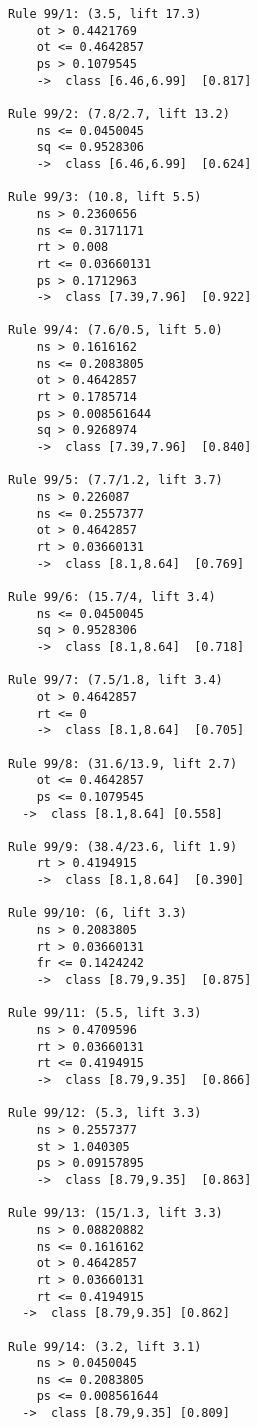 \begin{tcolorbox}[title=Reglas de clasificación para identificar intervalos de notas.]
  \makeatletter
  \makeatother
  
 \label{rulesbegin2}  
  
\begin{multicols}{3}
    \begin{verbatim}
Rule 99/1: (3.5, lift 17.3)
	ot > 0.4421769
	ot <= 0.4642857
	ps > 0.1079545
	->  class [6.46,6.99]  [0.817]

Rule 99/2: (7.8/2.7, lift 13.2)
	ns <= 0.0450045
	sq <= 0.9528306
	->  class [6.46,6.99]  [0.624]

Rule 99/3: (10.8, lift 5.5)
	ns > 0.2360656
	ns <= 0.3171171
	rt > 0.008
	rt <= 0.03660131
	ps > 0.1712963
	->  class [7.39,7.96]  [0.922]

Rule 99/4: (7.6/0.5, lift 5.0)
	ns > 0.1616162
	ns <= 0.2083805
	ot > 0.4642857
	rt > 0.1785714
	ps > 0.008561644
	sq > 0.9268974
	->  class [7.39,7.96]  [0.840]

Rule 99/5: (7.7/1.2, lift 3.7)
	ns > 0.226087
	ns <= 0.2557377
	ot > 0.4642857
	rt > 0.03660131
	->  class [8.1,8.64]  [0.769]

Rule 99/6: (15.7/4, lift 3.4)
	ns <= 0.0450045
	sq > 0.9528306
	->  class [8.1,8.64]  [0.718]

Rule 99/7: (7.5/1.8, lift 3.4)
	ot > 0.4642857
	rt <= 0
	->  class [8.1,8.64]  [0.705]

Rule 99/8: (31.6/13.9, lift 2.7)
	ot <= 0.4642857
	ps <= 0.1079545
  ->  class [8.1,8.64] [0.558]

Rule 99/9: (38.4/23.6, lift 1.9)
	rt > 0.4194915
	->  class [8.1,8.64]  [0.390]

Rule 99/10: (6, lift 3.3)
	ns > 0.2083805
	rt > 0.03660131
	fr <= 0.1424242
	->  class [8.79,9.35]  [0.875]

Rule 99/11: (5.5, lift 3.3)
	ns > 0.4709596
	rt > 0.03660131
	rt <= 0.4194915
	->  class [8.79,9.35]  [0.866]

Rule 99/12: (5.3, lift 3.3)
	ns > 0.2557377
	st > 1.040305
	ps > 0.09157895
	->  class [8.79,9.35]  [0.863]

Rule 99/13: (15/1.3, lift 3.3)
	ns > 0.08820882
	ns <= 0.1616162
	ot > 0.4642857
	rt > 0.03660131
	rt <= 0.4194915
  ->  class [8.79,9.35] [0.862]

Rule 99/14: (3.2, lift 3.1)
	ns > 0.0450045
	ns <= 0.2083805
	ps <= 0.008561644
  ->  class [8.79,9.35] [0.809]


\end{verbatim}
\end{multicols}
\end{tcolorbox}
